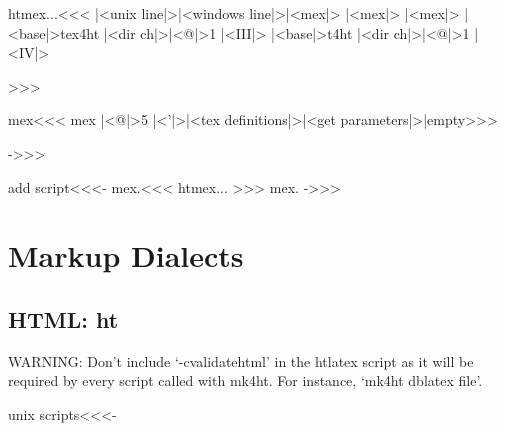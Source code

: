 \documentclass{article}
\begin{document}
\<htmex...\><<<
|<unix line|>|<windows line|>|<mex|>
        |<mex|>
        |<mex|>
        |<base|>tex4ht |<dir ch|>|<@|>1 |<III|>
        |<base|>t4ht |<dir ch|>|<@|>1 |<IV|>

>>>

\<mex\><<<
mex |<@|>5 |<'|>|<tex definitions|>|<get parameters|>|empty>>>

->>>


\<add script\><<<-
\<\pref mex.\ext\><<<
\<htmex...\>
>>> %
%
\OutputCodE\<\pref mex.\ext\>      %
%
->>>

% 
% 
% 
% 
% 
% 
% 
% 
% 



\section{Markup Dialects}

\subsection{HTML: ht}


WARNING: Don't include `-cvalidatehtml' in the htlatex script as it will
be required by every script called with mk4ht.  For instance, `mk4ht
dblatex file'.

\<unix scripts\><<<-
\end{document}
